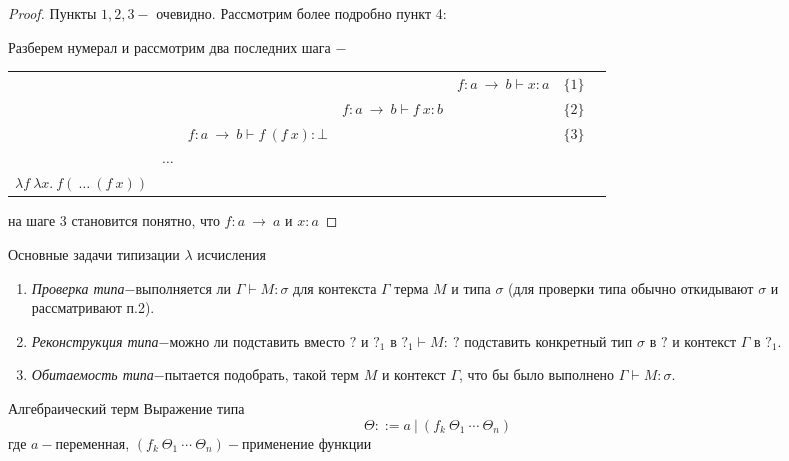 	\begin{proof}
		Пункты $1, 2, 3-$ очевидно. Рассмотрим более подробно пункт 4:
		\par Разберем нумерал и рассмотрим два последних шага $-$


	\begin{table}[H]
			\begin{tabular}{ccccccc}
				&&&&\multicolumn{1}{c}{$f:a\:\rightarrow\:b  \vdash  x:a$}& $\{1\}$\\
				\cline{4-5}
				&&&\multicolumn{1}{c}{$f:a\:\rightarrow\:b  \vdash f\:x:b$}&&$\{2\}$\\
				\cline{3-4}
				&&\multicolumn{1}{c}{$f:a\:\rightarrow\:b  \vdash f\:(f\:x):\bot$}&&&$\{3\}$\\
				\cline{2-3}
				&\multicolumn{1}{c}{$\hdots$}\\
				\cline{1-2}
				\multicolumn{1}{c}{$\lambda f\:\lambda x. \:f(\:\hdots\:(f\:x))$}&&&&&&\\
			\end{tabular}
		\end{table}
		на шаге 3 становится понятно, что $f:a\:\rightarrow\:a$ и $x:a$
		\end{proof}


	\begin{statement}Основные задачи типизации $\lambda$ исчисления\end{statement}
		\begin{enumerate}
			\item \emph{Проверка типа$-$}выполняется ли $\Gamma\vdash M:\sigma$ для контекста $\Gamma\text{ терма }M\text{ и типа }\sigma$ (для проверки типа обычно откидывают $\sigma$ и рассматривают п.2).
			\item \emph{Реконструкция типа$-$}можно ли подставить вместо $?$ и $?_1$ в $?_1\vdash M:\:?$ подставить конкретный тип $\sigma$ в $?$ и контекст $\Gamma$ в $?_1$.
			\item \emph{Обитаемость типа$-$}пытается подобрать, такой терм $M$ и контекст $\Gamma$, что бы было выполнено $\Gamma\vdash M:\sigma$.
		\end{enumerate}
	\begin{definition}Алгебраический терм Выражение типа $$\Theta::=a\:|\:(f_k\:\Theta_1\:\dotsb\:\Theta_n)$$ где $a-$переменная, $(f_k\:\Theta_1\:\dotsb\:\Theta_n)-$применение функции \end{definition}
